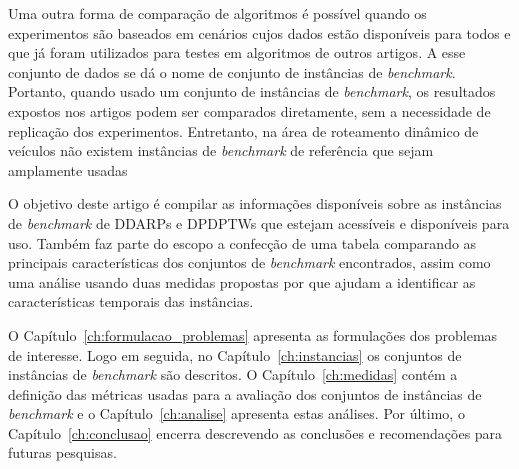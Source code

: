 Uma outra forma de comparação de algoritmos é possível quando os experimentos
são baseados em cenários cujos dados estão disponíveis para todos e
que já foram utilizados para testes em algoritmos de outros artigos.
A esse conjunto de dados se dá o nome de conjunto de instâncias de
\textit{benchmark}.
Portanto, quando usado um conjunto de instâncias de \textit{benchmark}, os
resultados expostos nos artigos podem ser comparados diretamente, sem a
necessidade de replicação dos experimentos.
Entretanto, na área de roteamento dinâmico de veículos não existem instâncias
de \textit{benchmark} de referência que sejam amplamente usadas
\cite{pillac_review_2013}

O objetivo deste artigo é compilar as informações disponíveis sobre as
instâncias de \textit{benchmark} de DDARPs e DPDPTWs que estejam acessíveis e
disponíveis para uso. Também faz parte do escopo a confecção de uma tabela
comparando as principais características dos conjuntos de \textit{benchmark}
encontrados, assim como uma análise usando duas medidas propostas por
\textcite{van_lon_measures_2016} que ajudam a identificar as características
temporais das instâncias.
\fi

O Capítulo~\ref{ch:formulacao_problemas} apresenta as formulações dos problemas
de interesse.
Logo em seguida, no Capítulo~\ref{ch:instancias} os conjuntos de instâncias de 
\textit{benchmark} são descritos.
O Capítulo~\ref{ch:medidas} contém a definição das métricas usadas para a 
avaliação dos conjuntos de instâncias de \textit{benchmark} e o 
Capítulo~\ref{ch:analise} apresenta estas análises.
Por último, o Capítulo~\ref{ch:conclusao} encerra descrevendo as conclusões  
e recomendações para futuras pesquisas.
